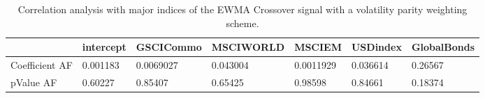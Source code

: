 \begin{table}[H]
\centering
\begin{tabular}{lllllll}
& intercept & GSCICommo & MSCIWORLD & MSCIEM & USDindex & GlobalBonds \\ 
\hline 
Coefficient AF & 0.001183 & 0.0069027 & 0.043004 & 0.0011929 & 0.036614 & 0.26567 \\ 
pValue AF & 0.60227 & 0.85407 & 0.65425 & 0.98598 & 0.84661 & 0.18374 \\ 
\hline
\end{tabular}
\caption{Correlation analysis with major indices of the EWMA Crossover signal with a volatility parity weighting scheme.}
\label{MBBSVPNR_AFACTOR}
\end{table}